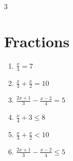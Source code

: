 \begin{multicols}{3}
		\section{Fractions}
		
		\begin{enumerate}
			\item $\frac{x}{3}=7$
			
			\item $\frac{x}{3}+\frac{x}{2}=10$
			
			\item $\frac{2x+1}{3}-\frac{x-2}{4}=5$
			
			\item $\frac{x}{4}+3\leq8$
			
			\item $\frac{x}{3}+\frac{x}{2}<10$
			
			\item $\frac{2x+1}{3}-\frac{x-2}{4}\leq5$
		\end{enumerate}
		
	\end{multicols}
	
